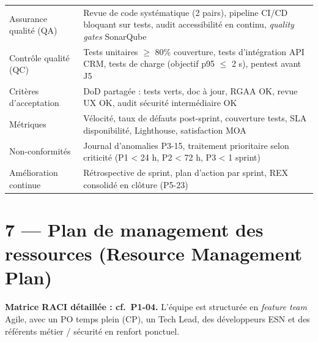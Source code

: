 \documentclass[11pt,a4paper,oneside]{report}
\begin{document}
\renewcommand{\arraystretch}{1.3}
\begin{tabularx}{\textwidth}{L{4.5cm} Y}
\toprule
{} &  \\
\midrule
Assurance qualité (QA)   & Revue de code systématique (2 pairs), pipeline CI/CD bloquant sur tests, audit accessibilité en continu, \textit{quality gates} SonarQube \\
Contrôle qualité (QC)    & Tests unitaires $\geq$ 80\% couverture, tests d'intégration API CRM, tests de charge (objectif p95 $\leq$ 2 s), pentest avant J5 \\
Critères d'acceptation   & DoD partagée : tests verts, doc à jour, RGAA OK, revue UX OK, audit sécurité intermédiaire OK \\
Métriques                & Vélocité, taux de défauts post-sprint, couverture tests, SLA disponibilité, Lighthouse, satisfaction MOA \\
Non-conformités          & Journal d'anomalies P3-15, traitement prioritaire selon criticité (P1 < 24 h, P2 < 72 h, P3 < 1 sprint) \\
Amélioration continue    & Rétrospective de sprint, plan d'action par sprint, REX consolidé en clôture (P5-23) \\
\bottomrule
\end{tabularx}

\section*{7 — Plan de management des ressources (Resource Management Plan)}

\textbf{Matrice RACI détaillée : cf.\ P1-04.} L'équipe est structurée en \textit{feature
team} Agile, avec un PO temps plein (CP), un Tech Lead, des développeurs ESN et des
référents métier / sécurité en renfort ponctuel.
\end{document}
